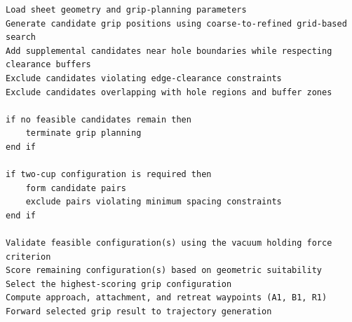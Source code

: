 \begin{lstlisting}[caption={Pseudocode for grip candidate search and selection.}, label={lst:grip-selection}]
Load sheet geometry and grip-planning parameters
Generate candidate grip positions using coarse-to-refined grid-based search
Add supplemental candidates near hole boundaries while respecting clearance buffers
Exclude candidates violating edge-clearance constraints
Exclude candidates overlapping with hole regions and buffer zones

if no feasible candidates remain then
    terminate grip planning
end if

if two-cup configuration is required then
    form candidate pairs
    exclude pairs violating minimum spacing constraints
end if

Validate feasible configuration(s) using the vacuum holding force criterion
Score remaining configuration(s) based on geometric suitability
Select the highest-scoring grip configuration
Compute approach, attachment, and retreat waypoints (A1, B1, R1)
Forward selected grip result to trajectory generation
\end{lstlisting}
